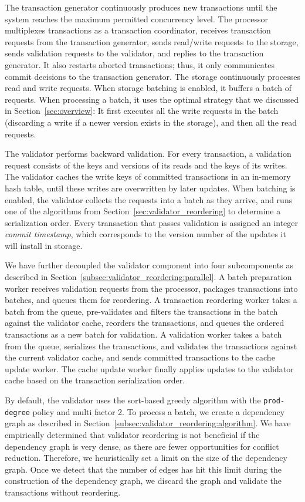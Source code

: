 The transaction generator continuously produces new transactions until the system reaches the maximum permitted concurrency level. The processor multiplexes transactions as a transaction coordinator, receives transaction requests from the transaction generator, sends read/write requests to the storage, sends validation requests to the validator, and replies to the transaction generator. It also restarts aborted transactions; thus, it only communicates commit decisions to the transaction generator. 
The storage continuously processes read and write requests. When storage batching is enabled, it buffers a batch of requests. When processing a batch, it uses the optimal strategy that we discussed in Section~\ref{sec:overview}: It first executes all the write requests in the batch (discarding a write if a newer version exists in the storage), and then all the read requests. 

The validator performs backward validation. For every transaction, a validation request consists of the keys and versions of its reads and the keys of its writes. The validator caches the write keys of committed transactions in an in-memory hash table, until these writes are overwritten by later updates. When batching is enabled, the validator collects the requests into a batch as they arrive, and runs one of the algorithms from Section~\ref{sec:validator_reordering} to determine a serialization order. Every transaction that passes validation is assigned an integer \emph{commit timestamp}, which corresponds to the version number of the updates it will install in storage. 

We have further decoupled the validator component into four subcomponents as described in Section~\ref{subsec:validator_reordering:parallel}. A batch preparation worker receives validation requests from the processor, packages transactions into batches, and queues them for reordering. A transaction reordering worker takes a batch from the queue, pre-validates and filters the transactions in the batch against the validator cache, reorders the transactions, and queues the ordered transactions as a new batch for validation. A validation worker takes a batch from the queue, serializes the transactions, and validates the transactions against the current validator cache, and sends committed transactions to the cache update worker. The cache update worker finally applies updates to the validator cache based on the transaction serialization order. 

By default, the validator uses the sort-based greedy algorithm with the \texttt{prod-degree} policy and multi factor 2. To process a batch, we create a dependency graph as described in Section~\ref{subsec:validator_reordering:algorithm}. We have empirically determined that validator reordering is not beneficial if the dependency graph is very dense, as there are fewer opportunities for conflict reduction. Therefore, we heuristically set a limit on the size of the dependency graph. Once we detect that the number of edges has hit this limit during the construction of the dependency graph, we discard the graph and validate the transactions without reordering. 

